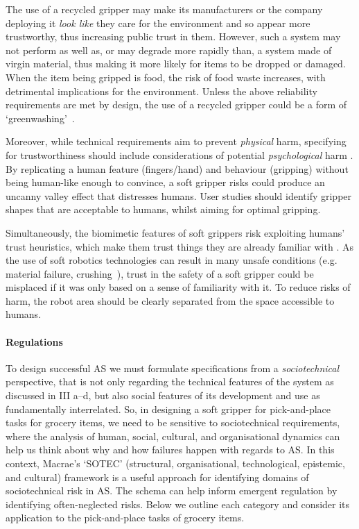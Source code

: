 \documentclass[letterpaper, 10 pt, conference]{ieeeconf}  %
\begin{document}
	The use of a recycled gripper may make its manufacturers or the company deploying it \emph{look like} they care for the environment and so appear more trustworthy, thus increasing public trust in them. However, such a system may not perform as well as, or may degrade more rapidly than, a system made of virgin material, thus making it more likely for items to be dropped or damaged. When the item being gripped is food, the risk of food waste increases, with detrimental implications for the environment. Unless the above reliability requirements are met by design, the use of a recycled gripper could be a form of `greenwashing'~\cite{delmas2011drivers}.    
	
	Moreover, while technical requirements aim to prevent \emph{physical} harm, specifying for trustworthiness should include considerations of potential \emph{psychological} harm \cite{Porter2023}. By replicating a human feature (fingers/hand) and behaviour (gripping) without being human-like enough to convince, a soft gripper risks could produce an uncanny valley effect \cite{moore2012bayesian} that distresses humans. User studies should identify gripper shapes that are acceptable to humans, whilst aiming for optimal gripping.  
	
	Simultaneously, the biomimetic features of soft grippers risk exploiting humans' trust heuristics, which make them trust things they are already familiar with \cite{Manzini}. As the use of soft robotics technologies can result in many unsafe conditions (e.g. material failure, crushing~\cite{abidi2017intrinsic}), trust in the safety of a soft gripper could be misplaced if it was only based on a sense of familiarity with it. To reduce risks of harm, the robot area should be clearly separated from the space accessible to humans.
	
	\paragraph{\textbf{Regulations}}\label{regulation}
	To design successful AS we must formulate specifications from a \emph{sociotechnical} perspective, that is not only regarding the technical features of the system as discussed in III a--d, but also social features of its development and use as fundamentally interrelated. So, in designing a soft gripper for pick-and-place tasks for grocery items, we need to be sensitive to sociotechnical requirements, where the analysis of human, social, cultural, and organisational dynamics can help us think about why and how failures happen with regards to AS. In this context, Macrae's \cite{Macrae2022} `SOTEC' (structural, organisational, technological, epistemic, and cultural) framework is a useful approach for identifying domains of sociotechnical risk in AS. The schema can help inform emergent regulation by identifying often-neglected risks. Below we outline each category and consider its application to the pick-and-place tasks of grocery items.
	
\end{document}
